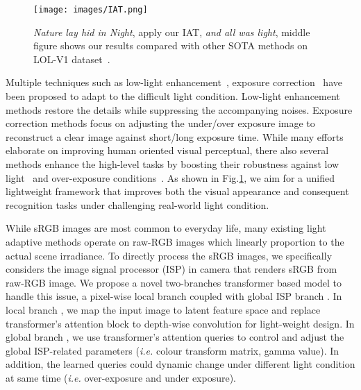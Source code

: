 \documentclass{bmvc2k}
\begin{document}
\begin{figure}[t]
    \centering
    \texttt{[image: images/IAT.png]}
    
    \caption{\textit{ Nature lay hid in Night}, apply our IAT, \textit{and all was light}, middle figure shows our results compared with other SOTA methods on LOL-V1 dataset~\cite{LOL_dataset}.}
    \label{fig_IAT}
    
\end{figure}

Multiple techniques such as low-light enhancement~\cite{retinex,Global_HE,LIME,LLNet,Lv2018MBLLEN,zero_dce,KIND,RCT_ICCV21,3DLUT,Deep_LPF,MLP_enhancement,Tan_enhancement}, exposure correction~\cite{exposure_ICCV2003,Exposure_ECCV12,Exposure_2021_CVPR,Learn_adapt_light,exposure_bmvc21} have been proposed to adapt to the difficult light condition. Low-light enhancement methods restore the details while suppressing the accompanying noises. Exposure correction methods focus on adjusting the under/over exposure image to reconstruct a clear image against short/long exposure time. While many efforts elaborate on improving human oriented visual perceptual, there also several methods  enhance the high-level tasks by boosting their robustness against low light~\cite{ICCV_MAET,IJCV_21_lowface,Hong_2021_BMVC,yolo-in-the-dark} and over-exposure conditions~\cite{DBGAN_2021_WACV_strong_light}. As shown in Fig.\ref{fig_IAT}, we aim for a unified lightweight framework that  improves both the visual appearance and consequent recognition tasks under challenging real-world light condition. 




While sRGB images are most common to everyday life, many existing light adaptive methods operate on raw-RGB images which linearly proportion to the actual scene irradiance. To directly process the sRGB images, we specifically considers the image signal processor (ISP) in camera that renders sRGB from raw-RGB image. We propose a novel two-branches transformer based model to handle this issue, a pixel-wise local branch  coupled with global ISP branch . In local branch , we map the input image to latent feature space and replace transformer's attention block to depth-wise convolution for light-weight design. In global branch , we use transformer's attention queries to control and adjust the global ISP-related parameters (\textit{i.e.} colour transform matrix, gamma value). In addition, the learned queries could dynamic change under different light condition at same time (\textit{i.e.} over-exposure and under exposure). 
\end{document}

